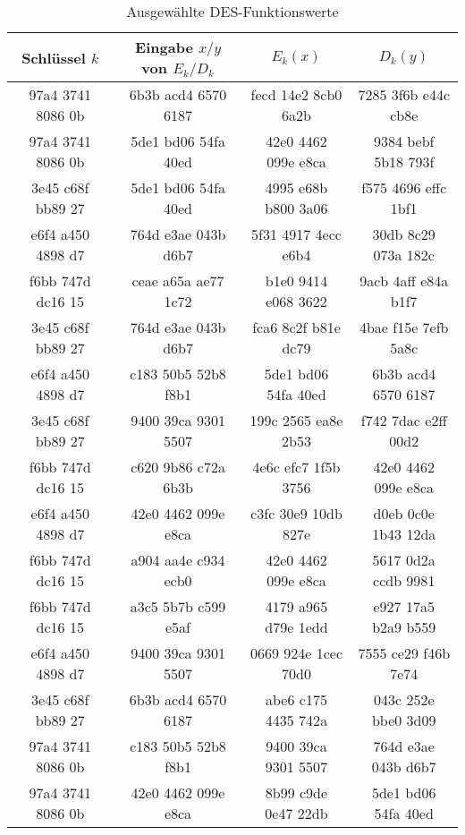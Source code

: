 \begin{table}[H]
  \centering
  \caption{Ausgewählte DES-Funktionswerte}
  \begin{tabular}{c|c|c|c}
  \textbf{Schlüssel $k$} & \textbf{Eingabe $x/y$ von $E_k/D_k$} & \textbf{$E_k(x)$} & \textbf{$D_k(y)$} \\ \hline
  97a4 3741 8086 0b & 6b3b acd4 6570 6187 & fecd 14e2 8cb0 6a2b & 7285 3f6b e44c cb8e \\ \hline
  97a4 3741 8086 0b & 5de1 bd06 54fa 40ed & 42e0 4462 099e e8ca & 9384 bebf 5b18 793f \\ \hline
  3e45 c68f bb89 27 & 5de1 bd06 54fa 40ed & 4995 e68b b800 3a06 & f575 4696 effc 1bf1 \\ \hline
  e6f4 a450 4898 d7 & 764d e3ae 043b d6b7 & 5f31 4917 4ecc e6b4 & 30db 8c29 073a 182c \\ \hline
  f6bb 747d dc16 15 & ceae a65a ae77 1c72 & b1e0 9414 e068 3622 & 9acb 4aff e84a b1f7 \\ \hline
  3e45 c68f bb89 27 & 764d e3ae 043b d6b7 & fca6 8c2f b81e dc79 & 4bae f15e 7efb 5a8c \\ \hline
  e6f4 a450 4898 d7 & c183 50b5 52b8 f8b1 & 5de1 bd06 54fa 40ed & 6b3b acd4 6570 6187 \\ \hline
  3e45 c68f bb89 27 & 9400 39ca 9301 5507 & 199c 2565 ea8e 2b53 & f742 7dac e2ff 00d2 \\ \hline
  f6bb 747d dc16 15 & c620 9b86 c72a 6b3b & 4e6c efc7 1f5b 3756 & 42e0 4462 099e e8ca \\ \hline
  e6f4 a450 4898 d7 & 42e0 4462 099e e8ca & c3fc 30e9 10db 827e & d0eb 0c0e 1b43 12da \\ \hline
  f6bb 747d dc16 15 & a904 aa4e c934 ecb0 & 42e0 4462 099e e8ca & 5617 0d2a ccdb 9981 \\ \hline
  f6bb 747d dc16 15 & a3c5 5b7b c599 e5af & 4179 a965 d79e 1edd & e927 17a5 b2a9 b559 \\ \hline
  e6f4 a450 4898 d7 & 9400 39ca 9301 5507 & 0669 924e 1cec 70d0 & 7555 ce29 f46b 7e74 \\ \hline
  3e45 c68f bb89 27 & 6b3b acd4 6570 6187 & abe6 c175 4435 742a & 043c 252e bbe0 3d09 \\ \hline
  97a4 3741 8086 0b & c183 50b5 52b8 f8b1 & 9400 39ca 9301 5507 & 764d e3ae 043b d6b7 \\ \hline
  97a4 3741 8086 0b & 42e0 4462 099e e8ca & 8b99 c9de 0e47 22db & 5de1 bd06 54fa 40ed \\
  \end{tabular}
\end{table}